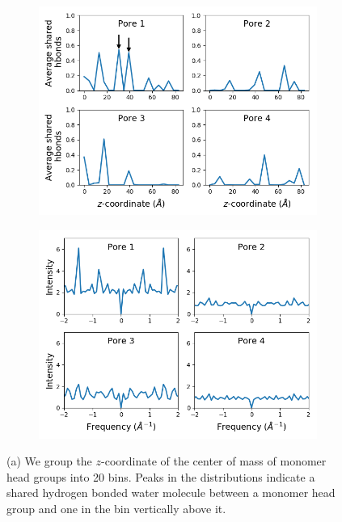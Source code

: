 \documentclass{article}
\begin{document}
  \begin{figure}[!htb]
  \centering
  \begin{subfigure}{0.45\textwidth}
  \includegraphics[width=\textwidth]{pore_hbonds.png}
  \caption{}\label{fig:pore_hbonds}
  \end{subfigure}
  \begin{subfigure}{0.45\textwidth}
  \includegraphics[width=\textwidth]{pore_hbonds_ft.png}
  \caption{}\label{fig:pore_hbonds_ft}
  \end{subfigure}
  \caption{(a) We group the $z$-coordinate of the center of mass of monomer
  head groups into 20 bins. Peaks in the distributions indicate a shared hydrogen bonded
  water molecule between a monomer head group and one in the bin vertically above it. 
}
\end{figure}
\end{document}
